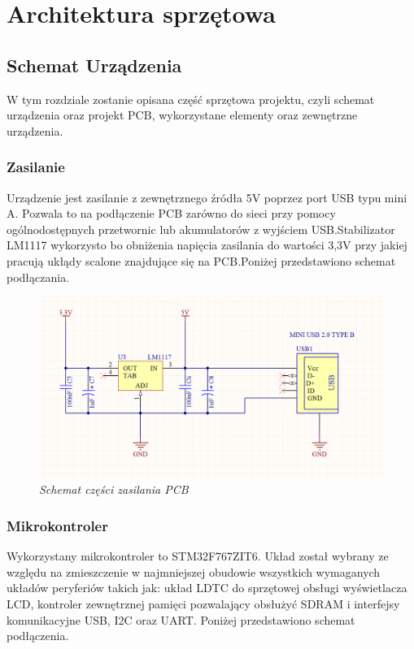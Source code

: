 \documentclass[eng,printmode]{mgr}
\begin{document}
\chapter{ Architektura sprzętowa}



\section{ Schemat Urządzenia}
W tym rozdziale zostanie opisana część sprzętowa projektu, czyli schemat urządzenia oraz projekt PCB, wykorzystane elementy oraz zewnętrzne urządzenia.
\subsection*{Zasilanie}
Urządzenie jest zasilanie z zewnętrznego źródła 5V poprzez port USB typu mini A. Pozwala to na podłączenie PCB zarówno do sieci przy pomocy ogólnodostępnych przetwornic lub akumulatorów z wyjściem USB.Stabilizator LM1117 wykorzysto bo obniżenia napięcia zasilania do wartości 3,3V przy jakiej pracują ukłądy scalone znajdujące się na PCB.Poniżej przedstawiono schemat podłączania.

\begin{figure}[!h]
    \centering
    \includegraphics[width=\textwidth]{schematics/power.png}
    \caption{\textit{\scriptsize Schemat części zasilania PCB}}
\end{figure}
\subsection*{Mikrokontroler}
Wykorzystany mikrokontroler to STM32F767ZIT6. Układ został wybrany ze względu na zmieszczenie w najmniejszej obudowie wszystkich wymaganych układów peryferiów takich jak: układ LDTC do sprzętowej obsługi wyświetlacza LCD, kontroler zewnętrznej pamięci pozwalający obsłużyć SDRAM i interfejsy komunikacyjne USB, I2C oraz UART. Poniżej przedstawiono schemat podłączenia.
\end{document}
